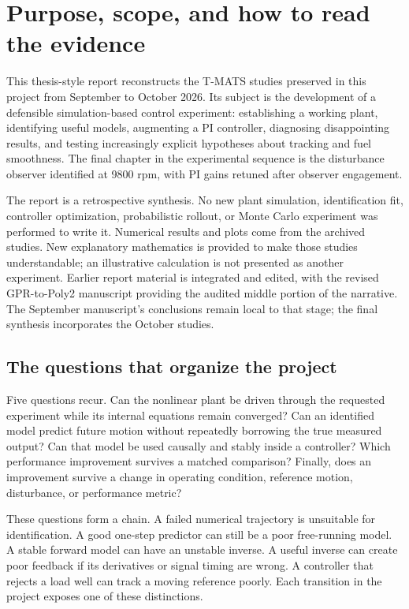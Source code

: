 \chapter{Purpose, scope, and how to read the evidence}
This thesis-style report reconstructs the T-MATS studies preserved in this project from September to October 2026. Its subject is the development of a defensible simulation-based control experiment: establishing a working plant, identifying useful models, augmenting a PI controller, diagnosing disappointing results, and testing increasingly explicit hypotheses about tracking and fuel smoothness. The final chapter in the experimental sequence is the disturbance observer identified at 9800 rpm, with PI gains retuned after observer engagement.

The report is a retrospective synthesis. No new plant simulation, identification fit, controller optimization, probabilistic rollout, or Monte Carlo experiment was performed to write it. Numerical results and plots come from the archived studies. New explanatory mathematics is provided to make those studies understandable; an illustrative calculation is not presented as another experiment. Earlier report material is integrated and edited, with the revised GPR-to-Poly2 manuscript providing the audited middle portion of the narrative. The September manuscript's conclusions remain local to that stage; the final synthesis incorporates the October studies.

\section{The questions that organize the project}
Five questions recur. Can the nonlinear plant be driven through the requested experiment while its internal equations remain converged? Can an identified model predict future motion without repeatedly borrowing the true measured output? Can that model be used causally and stably inside a controller? Which performance improvement survives a matched comparison? Finally, does an improvement survive a change in operating condition, reference motion, disturbance, or performance metric?

These questions form a chain. A failed numerical trajectory is unsuitable for identification. A good one-step predictor can still be a poor free-running model. A stable forward model can have an unstable inverse. A useful inverse can create poor feedback if its derivatives or signal timing are wrong. A controller that rejects a load well can track a moving reference poorly. Each transition in the project exposes one of these distinctions.

